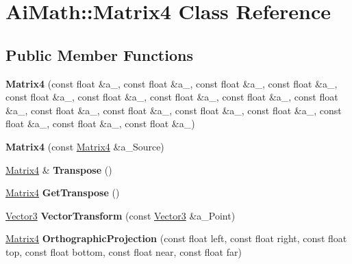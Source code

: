 \hypertarget{class_ai_math_1_1_matrix4}{\section{Ai\+Math\+:\+:Matrix4 Class Reference}
\label{class_ai_math_1_1_matrix4}
}
\subsection*{Public Member Functions}
\begin{DoxyCompactItemize}
\item 
\hypertarget{class_ai_math_1_1_matrix4_a010a10dc5f24a1cd0a4b06ec7f928177}{{\bfseries Matrix4} (const float \&a\+\_, const float \&a\+\_, const float \&a\+\_, const float \&a\+\_, const float \&a\+\_, const float \&a\+\_, const float \&a\+\_, const float \&a\+\_, const float \&a\+\_, const float \&a\+\_, const float \&a\+\_, const float \&a\+\_, const float \&a\+\_, const float \&a\+\_, const float \&a\+\_, const float \&a\+\_)}\label{class_ai_math_1_1_matrix4_a010a10dc5f24a1cd0a4b06ec7f928177}

\item 
\hypertarget{class_ai_math_1_1_matrix4_ac89260fba1d2c7ddf72c297a470157f6}{{\bfseries Matrix4} (const \hyperlink{class_ai_math_1_1_matrix4}{Matrix4} \&a\+\_\+\+Source)}\label{class_ai_math_1_1_matrix4_ac89260fba1d2c7ddf72c297a470157f6}

\item 
\hypertarget{class_ai_math_1_1_matrix4_ad35c8d03d50dcf5ea96e385776e473fd}{\hyperlink{class_ai_math_1_1_matrix4}{Matrix4} \& {\bfseries Transpose} ()}\label{class_ai_math_1_1_matrix4_ad35c8d03d50dcf5ea96e385776e473fd}

\item 
\hypertarget{class_ai_math_1_1_matrix4_acd68955f2628b1d9bbcae15de9ff4e48}{\hyperlink{class_ai_math_1_1_matrix4}{Matrix4} {\bfseries Get\+Transpose} ()}\label{class_ai_math_1_1_matrix4_acd68955f2628b1d9bbcae15de9ff4e48}

\item 
\hypertarget{class_ai_math_1_1_matrix4_a02ecd8769e94eae3f369f45022b6ef71}{\hyperlink{class_ai_math_1_1_vector3}{Vector3} {\bfseries Vector\+Transform} (const \hyperlink{class_ai_math_1_1_vector3}{Vector3} \&a\+\_\+\+Point)}\label{class_ai_math_1_1_matrix4_a02ecd8769e94eae3f369f45022b6ef71}

\item 
\hypertarget{class_ai_math_1_1_matrix4_a6bc443f547d519ec9dcb382e1ea9db9c}{\hyperlink{class_ai_math_1_1_matrix4}{Matrix4} {\bfseries Orthographic\+Projection} (const float left, const float right, const float top, const float bottom, const float near, const float far)}\label{class_ai_math_1_1_matrix4_a6bc443f547d519ec9dcb382e1ea9db9c}


\end{DoxyCompactItemize}
